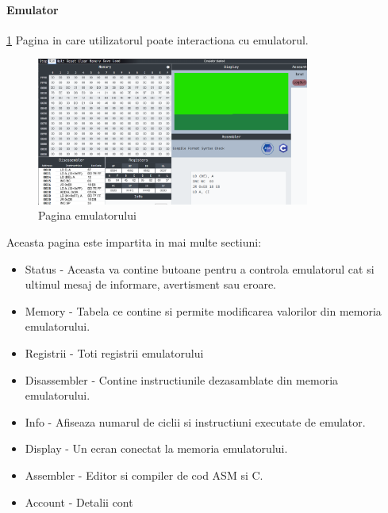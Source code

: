 \documentclass[titlepage,12pt]{article}
\begin{document}
\paragraph {Emulator} \cref {fig:emulatorpage} Pagina in care utilizatorul poate interactiona cu emulatorul.
\begin{figure}[h!]
    \centering
    \includegraphics[width=0.8\textwidth]{images/emulatorpage.png}
    \caption{Pagina emulatorului}
    \label{fig:emulatorpage}
\end{figure}

Aceasta pagina este impartita in mai multe sectiuni:
\begin{itemize}
    \item {Status} - Aceasta va contine butoane pentru a controla emulatorul cat si ultimul mesaj de informare, avertisment sau eroare.
    \item {Memory} - Tabela ce contine si permite modificarea valorilor din memoria emulatorului.
    \item {Registrii} - Toti registrii emulatorului
    \item {Disassembler} - Contine instructiunile dezasamblate din memoria emulatorului.
    \item {Info} - Afiseaza numarul de ciclii si instructiuni executate de emulator.
    \item {Display} - Un ecran conectat la memoria emulatorului.
    \item {Assembler} - Editor si compiler de cod ASM si C.
    \item {Account} - Detalii cont
\end{itemize}
\end{document}
